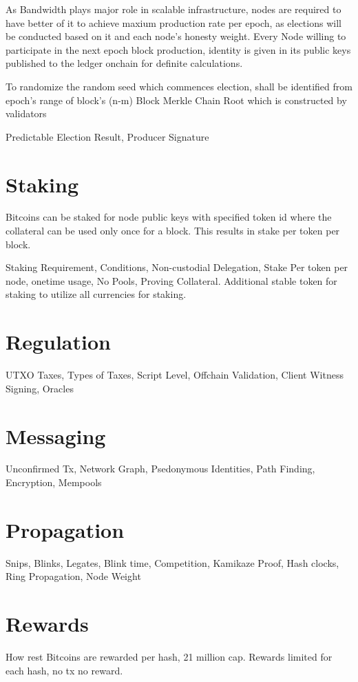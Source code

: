 \documentclass[a4paper,11pt]{article}
\begin{document}
As Bandwidth plays major role in scalable infrastructure, nodes are required to have better of it to achieve maxium production rate per epoch, as elections will be conducted based on it and each node's honesty weight. Every Node willing to participate in the next epoch block production, identity is given in its public keys published to the ledger onchain for definite calculations.

To randomize the random seed which commences election, shall be identified from epoch's range of block's (n-m) Block Merkle Chain Root which is constructed by validators

Predictable Election Result, Producer Signature


\section{Staking}

Bitcoins can be staked for node public keys with specified token id where the collateral can be used only once for a block. This results in stake per token per block.


Staking Requirement, Conditions, Non-custodial Delegation, Stake Per token per node, onetime usage, No Pools, Proving Collateral. Additional stable token for staking to utilize all currencies for staking.

\section{Regulation}
UTXO Taxes, Types of Taxes, Script Level, Offchain Validation, Client Witness Signing, Oracles

\section{Messaging}
Unconfirmed Tx, Network Graph, Psedonymous Identities, Path Finding, Encryption, Mempools

\section{Propagation}
Snips, Blinks, Legates, Blink time, Competition, Kamikaze Proof, Hash clocks, Ring Propagation, Node Weight

\section{Rewards}
How rest Bitcoins are rewarded per hash, 21 million cap. Rewards limited for each hash, no tx no reward.
\end{document}
